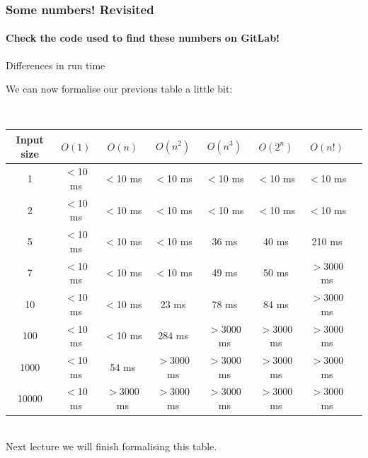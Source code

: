 \begin{frame}
	\frametitle{Some numbers! Revisited}
	\framesubtitle{Check the code used to find these numbers on GitLab!}
	
	\begin{exampleblock}{Differences in run time}

		We can now formalise our previous table a little bit:
		\pause

		\hfill\\
		\begin{tabular}{c | c c c c c c c}
			\small
			Input size & \alert{$O(1)$} & \alert{$O(n)$} & \alert{$O(n^2)$} & \alert{$O(n^3)$} & \alert{$O(2^n)$} & \alert{$O(n!)$} \\
			\midrule
			1 & $<$10 ms & $<$10 ms & $<$10 ms & $<$10 ms & $<$10 ms & $<$10 ms\\
			2 & $<$10 ms & $<$10 ms & $<$10 ms & $<$10 ms & $<$10 ms & $<$10 ms\\
			5 & $<$10 ms & $<$10 ms & $<$10 ms & 36 ms & 40 ms & 210 ms\\
			7 & $<$10 ms & $<$10 ms & $<$10 ms & 49 ms & 50 ms & $>$3000 ms \\
			10 & $<$10 ms & $<$10 ms & 23 ms & 78 ms & 84 ms & $>$3000 ms\\
			100 & $<$10 ms & $<$10 ms & 284 ms & $>$3000 ms & $>$3000 ms & $>$3000 ms \\
			1000 & $<$10 ms & 54 ms & $>$3000 ms &$>$3000 ms & $>$3000 ms & $>$3000 ms \\
			10000 & $<$10 ms &  $>$3000 ms &$>$3000 ms &$>$3000 ms & $>$3000 ms & $>$3000 ms \\
		\end{tabular}
		\pause
		\hfill\\
		Next lecture we will finish formalising this table.
	\end{exampleblock}	
\end{frame}

